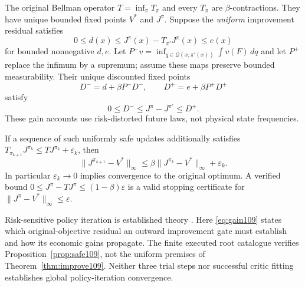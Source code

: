 \begin{theorem}\label{thm:improve109}
The original Bellman operator $T=\inf_\pi T_\pi$ and every $T_\pi$ are $\beta$-contractions. They have unique bounded fixed points $V^*$ and $J^\pi$. Suppose the \emph{uniform} improvement residual satisfies
\[
 0\le d(x)\le J^\pi(x)-T_{\pi'}J^\pi(x)\le e(x)
\]
for bounded nonnegative $d,e$. Let $P^-v=\inf_{q\in\mathcal Q(x,\pi'(x))}\int v(F)\,dq$ and let $P^+$ replace the infimum by a supremum; assume these maps preserve bounded measurability. Their unique discounted fixed points
\[
 D^-=d+\beta P^-D^-,\qquad D^+=e+\beta P^+D^+
\]
satisfy
\begin{equation}\label{eq:gain109}
 0\le D^-\le J^\pi-J^{\pi'}\le D^+.
\end{equation}
These gain accounts use risk-distorted future laws, not physical state frequencies.

If a sequence of such uniformly safe updates additionally satisfies
$T_{\pi_{k+1}}J^{\pi_k}\le TJ^{\pi_k}+\varepsilon_k$, then
\begin{equation}\label{eq:policyiteration109}
 \|J^{\pi_{k+1}}-V^*\|_\infty
 \le\beta\|J^{\pi_k}-V^*\|_\infty+\varepsilon_k.
\end{equation}
In particular $\varepsilon_k\to0$ implies convergence to the original optimum. A verified bound $0\le J^\pi-TJ^\pi\le(1-\beta)\varepsilon$ is a valid stopping certificate for $\|J^\pi-V^*\|_\infty\le\varepsilon$.
\end{theorem}

Risk-sensitive policy iteration is established theory \citep{ruszczynski2010risk,ruszczynski2014erratum}. Here \eqref{eq:gain109} states which original-objective residual an outward improvement gate must establish and how its economic gains propagate. The finite executed root catalogue verifies Proposition~\ref{prop:safe109}, not the uniform premises of Theorem~\ref{thm:improve109}. Neither three trial steps nor successful critic fitting establishes global policy-iteration convergence.

